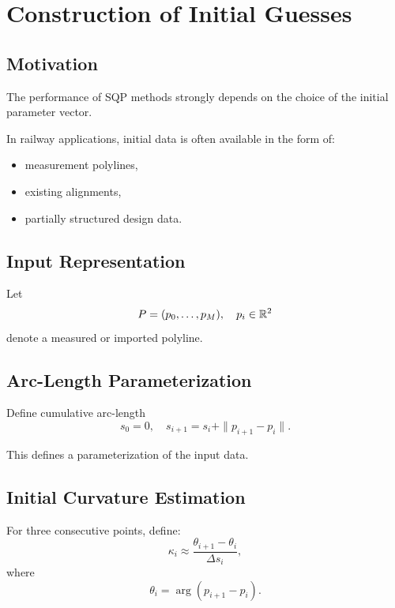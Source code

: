 
\section{Construction of Initial Guesses}

\subsection{Motivation}

The performance of SQP methods strongly depends on the choice of the
initial parameter vector.

In railway applications, initial data is often available in the form of:
\begin{itemize}
\item measurement polylines,
\item existing alignments,
\item partially structured design data.
\end{itemize}

\subsection{Input Representation}

\begin{definition}
Let
\[
P = (p_0,\dots,p_M), \quad p_i \in \mathbb{R}^2
\]
denote a measured or imported polyline.
\end{definition}

\subsection{Arc-Length Parameterization}

\begin{definition}
Define cumulative arc-length
\[
s_0 = 0,
\quad
s_{i+1} = s_i + \|p_{i+1} - p_i\|.
\]
\end{definition}

This defines a parameterization of the input data.

\subsection{Initial Curvature Estimation}

\begin{definition}
For three consecutive points, define:
\[
\kappa_i
\approx
\frac{\theta_{i+1} - \theta_i}{\Delta s_i},
\]
where
\[
\theta_i = \arg(p_{i+1} - p_i).
\]
\end{definition}

